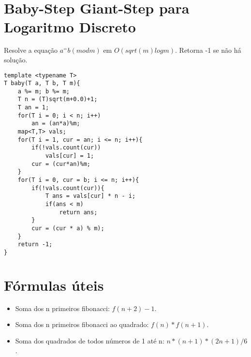 \section{Baby-Step Giant-Step para Logaritmo Discreto}
Resolve a equação $a^ = b(modm)$ em $O(sqrt(m)log m)$. Retorna -1 se não há solução.
\begin{multicols}{2}
\begin{lstlisting}
template <typename T>
T baby(T a, T b, T m){
	a %= m; b %= m;
	T n = (T)sqrt(m+0.0)+1;
	T an = 1;
	for(T i = 0; i < n; i++)
		an = (an*a)%m;
	map<T,T> vals;
	for(T i = 1, cur = an; i <= n; i++){
		if(!vals.count(cur))
			vals[cur] = 1;
		cur = (cur*an)%m;
	}
	for(T i = 0, cur = b; i <= n; i++){
		if(!vals.count(cur)){
			T ans = vals[cur] * n - i;
			if(ans < m)
				return ans;
		}
		cur = (cur * a) % m);
	}
	return -1;
}

\end{lstlisting}
\end{multicols}

\section{Fórmulas úteis}


\begin{itemize}
\itemsep0em
\item Soma dos n primeiros fibonacci: $f(n+2)-1$.
\item Soma dos n primeiros fibonacci ao quadrado: $f(n)*f(n+1)$.
\item Soma dos quadrados de todos números de 1 até n:   $n*(n+1)*(2n+1)/6$.
\end{itemize}

